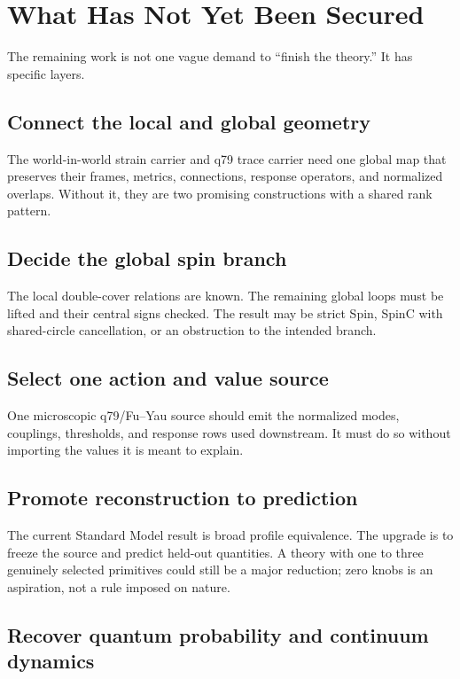 \documentclass[11pt,openany]{book}
\begin{document}
\chapter{What Has Not Yet Been Secured}

The remaining work is not one vague demand to ``finish the theory.'' It has
specific layers.

\section*{Connect the local and global geometry}

The world-in-world strain carrier and q79 trace carrier need one global map
that preserves their frames, metrics, connections, response operators, and
normalized overlaps. Without it, they are two promising constructions with a
shared rank pattern.

\section*{Decide the global spin branch}

The local double-cover relations are known. The remaining global loops must
be lifted and their central signs checked. The result may be strict Spin,
SpinC with shared-circle cancellation, or an obstruction to the intended
branch.

\section*{Select one action and value source}

One microscopic q79/Fu--Yau source should emit the normalized modes,
couplings, thresholds, and response rows used downstream. It must do so
without importing the values it is meant to explain.

\section*{Promote reconstruction to prediction}

The current Standard Model result is broad profile equivalence. The upgrade
is to freeze the source and predict held-out quantities. A theory with one to
three genuinely selected primitives could still be a major reduction; zero
knobs is an aspiration, not a rule imposed on nature.

\section*{Recover quantum probability and continuum dynamics}
\end{document}
